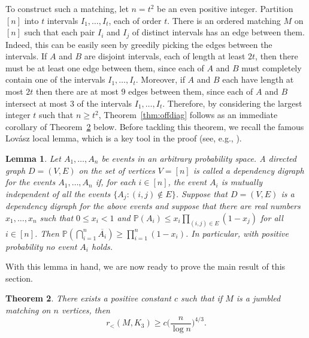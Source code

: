 \documentclass[11pt]{article}
\newtheorem{theorem}{Theorem}[section]
\newtheorem{lemma}[theorem]{Lemma}
\begin{document}
To construct such a matching, let $n = t^2$ be an even positive integer. Partition $[n]$ into $t$ intervals $I_1, \dots, I_t$, each of order $t$. There is an ordered matching $M$ on $[n]$ such that each pair $I_i$ and $I_j$ of distinct intervals has an edge between them. Indeed, this can be easily seen by greedily picking the edges between the intervals. If $A$ and $B$ are disjoint intervals, each of length at least $2t$, then there must be at least one edge between them, since each of $A$ and $B$ must completely contain one of the intervals $I_1, \dots, I_t$. Moreover, if $A$ and $B$ each have length at most $2t$ then there are at most $9$ edges between them, since each of $A$ and $B$ intersect at most $3$ of the intervals $I_1, \dots, I_t$. Therefore, by considering the largest integer $t$ such that $n \geq t^2$, Theorem~\ref{thm:offdiag} follows as an immediate corollary of Theorem~\ref{thm:offdiagjumb} below. Before tackling this theorem, we recall the famous Lov\'asz local lemma, which is a key tool in the proof (see, e.g., \cite{AlSp}).

\begin{lemma}
Let $A_1, \dots, A_n$ be events in an arbitrary probability space.
A directed graph $D=(V,E)$ on the set of vertices $V=[n]$
is called a dependency digraph for the events $A_1, \ldots, A_n$
if, for each $i \in [n]$, the event $A_i$ is mutually independent of
all the events $\{A_j:(i,j)\notin E\}$. Suppose that $D=(V,E)$
is a dependency digraph for the above events and suppose that there are
real numbers $x_1,\ldots,x_n$ such that $0 \le x_i < 1$ and
$\mathbb{P}(A_i) \le x_i \prod_{(i,j)\in E} (1-x_j)$ for all $i \in [n]$.
Then $\mathbb{P}(\bigcap_{i=1}^{n} \overline{A_i}) \ge \prod_{i=1}^{n}(1-x_i)$.
In particular, with positive probability no event $A_i$ holds.
\end{lemma}

With this lemma in hand, we are now ready to prove the main result of this section.

\begin{theorem}  \label{thm:offdiagjumb}
There exists a positive constant $c$ such that if $M$ is a jumbled matching on $n$ vertices, then 
\[r_{<}(M, K_3) \ge c\Big(\frac{n}{\log n}\Big)^{4/3}.\]
\end{theorem}
\end{document}
